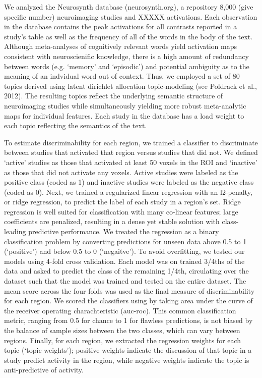 We analyzed the Neurosynth database (neurosynth.org), a repository 8,000 (give specific number) neuroimaging studies and XXXXX activations. Each observation in the database contains the peak activations for all contrasts reported in a study’s table as well as the frequency of all of the words in the body of the text. Although meta-analyses of cognitively relevant words yield activation maps consistent with neuroscienific knowledge, there is a high amount of redundancy between words (e.g. ‘memory’ and ‘episodic’) and potential ambiguity as to the meaning of an indvidual word out of context. Thus, we employed a set of 80 topics derived using latent dirichlet allocation topic-modeling (see Poldrack et al., 2012). The resulting topics reflect the underlying semantic structure of neuroimaging studies while simultaneously yielding more robust meta-analytic maps for individual features. Each study in the database has a load weight to each topic reflecting the semantics of the text. 

To estimate discriminability for each region, we trained a classifier to discriminate between studies that activated that region versus studies that did not. We defined ‘active’ studies as those that activated at least 50 voxels in the ROI and ‘inactive’ as those that did not activate any voxels. Active studies were labeled as the positive class (coded as 1) and inactive studies were labeled as the negative class (coded as 0). Next, we trained a regularized linear regression with an l2-penalty, or ridge regression, to predict the label of each study in a region’s set. Ridge regression is well suited for classification with many co-linear features; large coefficients are penalized, resulting in a dense yet stable solution with class-leading predictive performance. We treated the regression as a binary classification problem by converting predictions for unseen data above 0.5 to 1 (‘positive’) and below 0.5 to 0 (‘negaitve’). To avoid overfitting, we tested our models using 4-fold cross validation. Each model was on trained 3\slash 4ths of the data and asked to predict the class of the remaining 1\slash 4th, circulating over the dataset such that the model was trained and tested on the entire dataset. The mean score across the four folds was used as the final measure of discriminability for each region. We scored the classifiers using by taking area under the curve of the receiver operating charachteristic (auc-roc). This common classification metric, ranging from 0.5 for chance to 1 for flawless predictions, is not biased by the balance of sample sizes between the two classes, which can vary between regions. Finally, for each region, we extracted the regression weights for each topic (‘topic weights’); positive weights indicate the discussion of that topic in a study predict activity in the region, while negative weights indicate the topic is anti-predictive of activity. 

